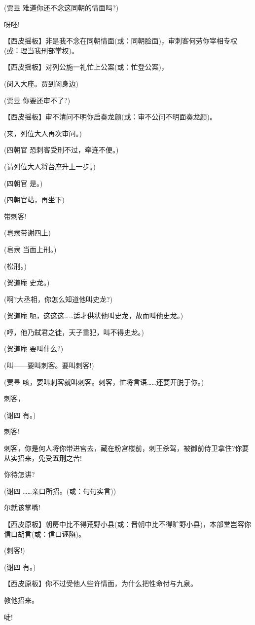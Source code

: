 (贾昱 难道你还不念这同朝的情面吗?)

呀呸!

【西皮摇板】非是我不念在同朝情面(或：同朝脸面)，审刺客何劳你宰相专权(或：理当我刑部掌权)。

【西皮摇板】对列公施一礼忙上公案(或：忙登公案)，

(闵入大座。贾到闵身边)

(贾昱 你要还审不了?)

【西皮摇板】审不清问不明你启奏龙颜(或：审不公问不明面奏龙颜)。

(来，列位大人再次审问。)

(四朝官 恐刺客受刑不过，牵连不便。)

(请列位大人将台座升上一步。)

(四朝官 是。)

(四朝官站，再坐下)

带刺客!

(皂隶带谢四上)

(皂隶 当面上刑。)

(松刑。)

(贺道庵 史龙。)

(啊?大丞相，你怎么知道他叫史龙?)

(贺道庵 呃，这这这\ldots{}\ldots{}适才供状他叫史龙，故而叫他史龙。)

(哼，他乃弑君之徒，天子重犯，叫不得史龙。)

(贺道庵 要叫什么?)

(叫------要叫刺客。要叫刺客!)

(贾昱
咳，要叫刺客就叫刺客。刺客，忙将言语\ldots{}\ldots{}还要开脱于你。)

刺客，

(谢四 有。)

刺客!

刺客，你是何人将你带进宫去，藏在粉宫楼前，刺王杀驾，被御前侍卫拿住?你要从实招来，免受\textbf{五刑}之苦!

你待怎讲?

(谢四 \ldots{}\ldots{}亲口所招。(或：句句实言))

尔就该掌嘴!

【西皮原板】朝房中比不得荒野小县(或：晋朝中比不得旷野小县)，本部堂岂容你信口胡言(或：信口诬陷)。

(刺客!)

(谢四 有。)

【西皮原板】你不过受他人些许情面，为什么把性命付与九泉。

教他招来。

唗!

